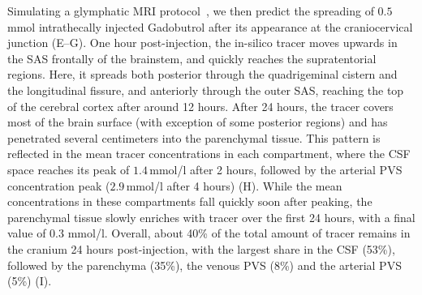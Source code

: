 \documentclass[fleqn,10pt]{wlscirep}
\newcommand{\mer}[1]{\textcolor{magenta}{#1}}
\begin{document}
Simulating a glymphatic MRI protocol~\cite{ringstad2017glymphatic,
  ringstad2018brain, eide2024functional}, we then predict the
spreading of $0.5$ mmol intrathecally injected Gadobutrol after its
appearance at the craniocervical junction
(E--G). One hour post-injection, the in-silico
tracer moves upwards in the SAS frontally of the brainstem, and
quickly reaches the supratentorial regions. Here, it spreads both
posterior through the quadrigeminal cistern and the longitudinal
fissure, and anteriorly through the outer SAS, reaching the top of the
cerebral cortex after around 12 hours. After 24 hours, the tracer
covers most of the brain surface (with exception of some posterior
regions) and has penetrated several centimeters into the parenchymal
tissue. This pattern is reflected in the mean tracer concentrations in
each compartment, where the CSF space reaches its peak of
$1.4\,$mmol/l after 2 hours, followed by the arterial PVS
concentration peak ($2.9\,$mmol/l after 4 hours)
(H). While the mean concentrations in these
compartments fall quickly soon after peaking, the parenchymal tissue
slowly enriches with tracer over the first 24 hours, with a final
value of $0.3$ mmol/l. Overall, about 40\% of the total amount of
tracer remains in the cranium 24 hours post-injection, with the largest
share in the CSF (53\%), followed by the parenchyma (35\%), the
venous PVS (8\%) and the arterial PVS
(5\%) (I).

\end{document}
